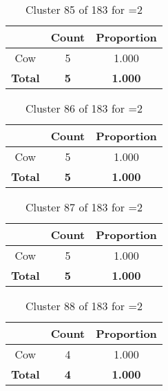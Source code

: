 \begin{table}[ht!]
\centering
\begin{tabular}{|c|c|c|}
\hline
\bf \Spec{} &\bf Count &\bf Proportion\\ \hline \hline
Cow & 5 & 1.000\\ \hline
\hline
\bf Total & \bf 5 & \bf 1.000\\ \hline
\end{tabular}
\label{tab:cluster:85:2}
\caption{Cluster 85 of 183 for \minneigh{}=2}
\end{table}

\begin{table}[ht!]
\centering
\begin{tabular}{|c|c|c|}
\hline
\bf \Spec{} &\bf Count &\bf Proportion\\ \hline \hline
Cow & 5 & 1.000\\ \hline
\hline
\bf Total & \bf 5 & \bf 1.000\\ \hline
\end{tabular}
\label{tab:cluster:86:2}
\caption{Cluster 86 of 183 for \minneigh{}=2}
\end{table}

\begin{table}[ht!]
\centering
\begin{tabular}{|c|c|c|}
\hline
\bf \Spec{} &\bf Count &\bf Proportion\\ \hline \hline
Cow & 5 & 1.000\\ \hline
\hline
\bf Total & \bf 5 & \bf 1.000\\ \hline
\end{tabular}
\label{tab:cluster:87:2}
\caption{Cluster 87 of 183 for \minneigh{}=2}
\end{table}

\begin{table}[ht!]
\centering
\begin{tabular}{|c|c|c|}
\hline
\bf \Spec{} &\bf Count &\bf Proportion\\ \hline \hline
Cow & 4 & 1.000\\ \hline
\hline
\bf Total & \bf 4 & \bf 1.000\\ \hline
\end{tabular}
\label{tab:cluster:88:2}
\caption{Cluster 88 of 183 for \minneigh{}=2}
\end{table}

